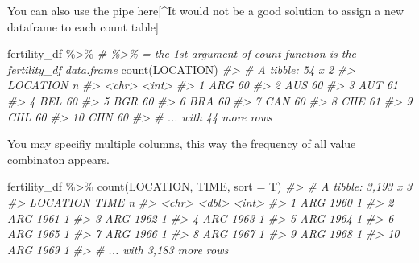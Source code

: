 \documentclass[
]{article}
\newenvironment{Shaded}{\begin{snugshade}}{\end{snugshade}}
\newcommand{\AttributeTok}[1]{\textcolor[rgb]{0.77,0.63,0.00}{#1}}
\newcommand{\CommentTok}[1]{\textcolor[rgb]{0.56,0.35,0.01}{\textit{#1}}}
\newcommand{\FunctionTok}[1]{\textcolor[rgb]{0.00,0.00,0.00}{#1}}
\newcommand{\NormalTok}[1]{#1}
\newcommand{\SpecialCharTok}[1]{\textcolor[rgb]{0.00,0.00,0.00}{#1}}
\begin{document}
You can also use the pipe here{[}\^{}It would not be a good solution to assign a new dataframe to each count table{]}

\begin{Shaded}
\begin{Highlighting}[]
\NormalTok{fertility\_df }\SpecialCharTok{\%\textgreater{}\%} \CommentTok{\# \%\textgreater{}\% = the 1st argument of count function is the fertility\_df data.frame}
  \FunctionTok{count}\NormalTok{(LOCATION)}
\CommentTok{\#\textgreater{} \# A tibble: 54 x 2}
\CommentTok{\#\textgreater{}    LOCATION     n}
\CommentTok{\#\textgreater{}    \textless{}chr\textgreater{}    \textless{}int\textgreater{}}
\CommentTok{\#\textgreater{}  1 ARG         60}
\CommentTok{\#\textgreater{}  2 AUS         60}
\CommentTok{\#\textgreater{}  3 AUT         61}
\CommentTok{\#\textgreater{}  4 BEL         60}
\CommentTok{\#\textgreater{}  5 BGR         60}
\CommentTok{\#\textgreater{}  6 BRA         60}
\CommentTok{\#\textgreater{}  7 CAN         60}
\CommentTok{\#\textgreater{}  8 CHE         61}
\CommentTok{\#\textgreater{}  9 CHL         60}
\CommentTok{\#\textgreater{} 10 CHN         60}
\CommentTok{\#\textgreater{} \# ... with 44 more rows}
\end{Highlighting}
\end{Shaded}

You may specifiy multiple columns, this way the frequency of all value combinaton appears.

\begin{Shaded}
\begin{Highlighting}[]
\NormalTok{fertility\_df }\SpecialCharTok{\%\textgreater{}\%} 
  \FunctionTok{count}\NormalTok{(LOCATION, TIME, }\AttributeTok{sort =}\NormalTok{ T)}
\CommentTok{\#\textgreater{} \# A tibble: 3,193 x 3}
\CommentTok{\#\textgreater{}    LOCATION  TIME     n}
\CommentTok{\#\textgreater{}    \textless{}chr\textgreater{}    \textless{}dbl\textgreater{} \textless{}int\textgreater{}}
\CommentTok{\#\textgreater{}  1 ARG       1960     1}
\CommentTok{\#\textgreater{}  2 ARG       1961     1}
\CommentTok{\#\textgreater{}  3 ARG       1962     1}
\CommentTok{\#\textgreater{}  4 ARG       1963     1}
\CommentTok{\#\textgreater{}  5 ARG       1964     1}
\CommentTok{\#\textgreater{}  6 ARG       1965     1}
\CommentTok{\#\textgreater{}  7 ARG       1966     1}
\CommentTok{\#\textgreater{}  8 ARG       1967     1}
\CommentTok{\#\textgreater{}  9 ARG       1968     1}
\CommentTok{\#\textgreater{} 10 ARG       1969     1}
\CommentTok{\#\textgreater{} \# ... with 3,183 more rows}
\end{Highlighting}
\end{Shaded}
\end{document}
